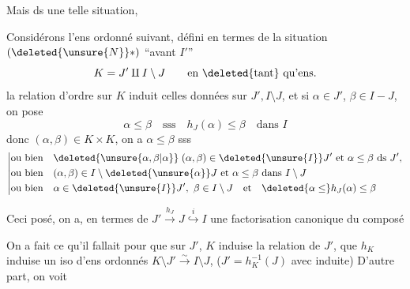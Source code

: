 
 Mais ds une telle situation,

Considérons l'ens ordonné suivant, défini en termes de la situation $(\deleted{\unsure{N}}*)$ ``avant $I'$''
\[
 K=J'\mathbin{\amalg} I\setminus J\qquad\text{en \deleted{tant} qu'ens.}
\]
la relation d'ordre sur $K$ induit celles données sur $J',I\setminus J$, et si $\alpha\in J'$, $\beta\in I-J$, on pose
\[
 \alpha\leq\beta\quad\text{sss}\quad h_J(\alpha)\leq\beta\quad\text{dans }I
\]
donc $(\alpha,\beta)\in K\times K$, on a $\alpha\leq\beta$ sss
\[
\left|\begin{aligned}
 &\text{ou bien}\quad \deleted{\unsure{\alpha,\beta|\alpha}}\;(\alpha,\beta)\in\deleted{\unsure{I}}J' \ \text{et}\ \alpha\leq\beta\ \text{ds }J',\\
 &\text{ou bien}\quad (\alpha,\beta)\in I\setminus\deleted{\unsure{\alpha}}J\ \text{et}\ \alpha\leq\beta\ \text{dans }I\setminus J\\
 &\text{ou bien}\quad \alpha\in\deleted{\unsure{I}}J',\ \beta\in I\setminus J\quad\text{et}\quad \deleted{\alpha\leq}h_J(\alpha)\leq\beta
\end{aligned}\right.
\]

Ceci posé, on a, en termes de $J'\xrightarrow{h_J}J\overset{i}{\hookrightarrow}I$ une factorisation canonique du composé

On a fait ce qu'il fallait pour que sur $J'$, $K$ induise la relation de $J'$, que $h_K$ induise un iso d'ens ordonnés $K\setminus J'\xrightarrow{\sim}I\setminus J$,     ($J'=h_K^{-1}(J)$ avec  induite) D'autre part, on voit
